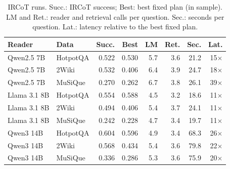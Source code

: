 \begin{table}[t]
\centering\footnotesize
\setlength{\tabcolsep}{3pt}
\caption{IRCoT runs. Succ.: IRCoT success; Best: best fixed plan (in sample). LM and Ret.: reader and retrieval calls per question. Sec.: seconds per question. Lat.: latency relative to the best fixed plan.}
\label{tab:p_ircot}
\begin{tabular*}{\linewidth}{@{\extracolsep{\fill}}llrrrrrr@{}}
\toprule
Reader & Data & Succ. & Best & LM & Ret. & Sec. & Lat. \\
\midrule
Qwen2.5 7B & HotpotQA & 0.522 & 0.530 & 5.7 & 3.6 & 21.2 & 15$\times$ \\
Qwen2.5 7B & 2Wiki & 0.532 & 0.406 & 6.4 & 3.9 & 24.7 & 18$\times$ \\
Qwen2.5 7B & MuSiQue & 0.270 & 0.262 & 6.7 & 3.8 & 26.1 & 39$\times$ \\
Llama 3.1 8B & HotpotQA & 0.554 & 0.588 & 4.5 & 3.2 & 18.6 & 11$\times$ \\
Llama 3.1 8B & 2Wiki & 0.494 & 0.406 & 5.4 & 3.7 & 24.1 & 11$\times$ \\
Llama 3.1 8B & MuSiQue & 0.242 & 0.228 & 4.7 & 3.4 & 19.7 & 11$\times$ \\
Qwen3 14B & HotpotQA & 0.604 & 0.596 & 4.9 & 3.4 & 68.3 & 26$\times$ \\
Qwen3 14B & 2Wiki & 0.568 & 0.434 & 5.4 & 3.6 & 79.8 & 22$\times$ \\
Qwen3 14B & MuSiQue & 0.336 & 0.286 & 5.3 & 3.6 & 75.9 & 20$\times$ \\
\bottomrule
\end{tabular*}
\end{table}
